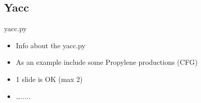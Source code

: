 \subsection{Yacc}
\begin{frame}{yacc.py}
  \begin{itemize}
    \item Info about the yacc.py
\N
    \item As an example include some Propylene productions (CFG)
\N
    \item 1 slide is OK (max 2)
\N
    \item \ldots..... 
 
  \end{itemize}
%
\N\N
\end{frame}
